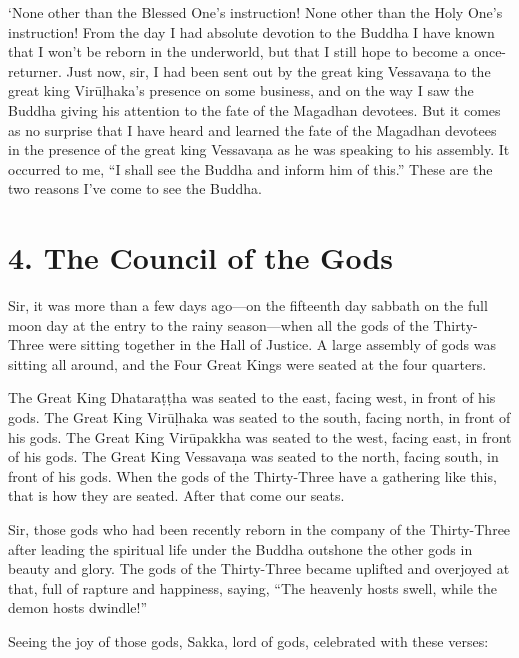 \documentclass[12pt,openany]{book}%
\begin{document}
‘None other than the Blessed One’s instruction! None other than the Holy One’s instruction! From the day I had absolute devotion to the Buddha I have known that I won’t be reborn in the underworld, but that I still hope to become a once-returner. Just now, sir, I had been sent out by the great king \textsanskrit{Vessavaṇa} to the great king \textsanskrit{Virūḷhaka}’s presence on some business, and on the way I saw the Buddha giving his attention to the fate of the Magadhan devotees. But it comes as no surprise that I have heard and learned the fate of the Magadhan devotees in the presence of the great king \textsanskrit{Vessavaṇa} as he was speaking to his assembly. It occurred to me, “I shall see the Buddha and inform him of this.” These are the two reasons I’ve come to see the Buddha. 

\section*{4. The Council of the Gods }

Sir, it was more than a few days ago—on the fifteenth day sabbath on the full moon day at the entry to the rainy season—when all the gods of the Thirty-Three were sitting together in the Hall of Justice. A large assembly of gods was sitting all around, and the Four Great Kings were seated at the four quarters. 

The Great King \textsanskrit{Dhataraṭṭha} was seated to the east, facing west, in front of his gods. The Great King \textsanskrit{Virūḷhaka} was seated to the south, facing north, in front of his gods. The Great King \textsanskrit{Virūpakkha} was seated to the west, facing east, in front of his gods. The Great King \textsanskrit{Vessavaṇa} was seated to the north, facing south, in front of his gods. When the gods of the Thirty-Three have a gathering like this, that is how they are seated. After that come our seats. 

Sir, those gods who had been recently reborn in the company of the Thirty-Three after leading the spiritual life under the Buddha outshone the other gods in beauty and glory. The gods of the Thirty-Three became uplifted and overjoyed at that, full of rapture and happiness, saying, “The heavenly hosts swell, while the demon hosts dwindle!” 

Seeing the joy of those gods, Sakka, lord of gods, celebrated with these verses: 
\end{document}

